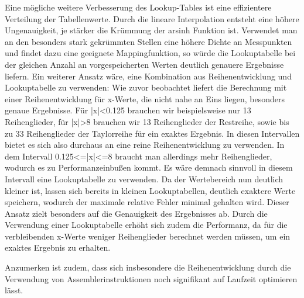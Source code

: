\documentclass[course=erap] {aspdoc}
\begin{document}
     Eine mögliche weitere Verbesserung des Lookup-Tables ist eine effizientere Verteilung der Tabellenwerte. Durch die lineare Interpolation entsteht eine höhere Ungenauigkeit, je stärker die Krümmung der arsinh Funktion ist. Verwendet man an den besonders stark gekrümmten Stellen eine höhere Dichte an Messpunkten und findet dazu eine geeignete Mappingfunktion, so würde die Lookuptabelle bei der gleichen Anzahl an vorgespeicherten Werten deutlich genauere Ergebnisse liefern.
     Ein weiterer Ansatz wäre, eine Kombination aus Reihenentwicklung und Lookuptabelle zu verwenden: 
     Wie zuvor beobachtet liefert die Berechnung mit einer Reihenentwicklung für x-Werte, die nicht nahe an Eins liegen, besonders genaue Ergebnisse. Für |x|<0.125 brauchen wir beispielsweise nur 13 Reihenglieder, für |x|>8 brauchen wir 13 Reihenglieder der Restreihe, sowie bis zu 33 Reihenglieder der Taylorreihe für ein exaktes Ergebnis. In diesen Intervallen bietet es sich also durchaus an eine reine Reihenentwicklung zu verwenden. In dem Intervall 0.125<=|x|<=8 braucht man allerdings mehr Reihenglieder, wodurch es zu Performanzeinbußen kommt. Es wäre demnach sinnvoll in diesem Intervall eine Lookuptabelle zu verwenden. Da der Wertebereich nun deutlich kleiner ist, lassen sich bereits in kleinen Lookuptabellen, deutlich exaktere Werte speichern, wodurch der maximale relative Fehler minimal gehalten wird. Dieser Ansatz zielt besonders auf die Genauigkeit des Ergebnisses ab. Durch die Verwendung einer Lookuptabelle erhöht sich zudem die Performanz, da für die verbleibenden x-Werte weniger Reihenglieder berechnet werden müssen, um ein exaktes Ergebnis zu erhalten. 
 
     Anzumerken ist zudem, dass sich insbesondere die Reihenentwicklung durch die Verwendung von Assemblerinstruktionen noch signifikant auf Laufzeit optimieren lässt. 
 
     
     
 
 
\end{document}
